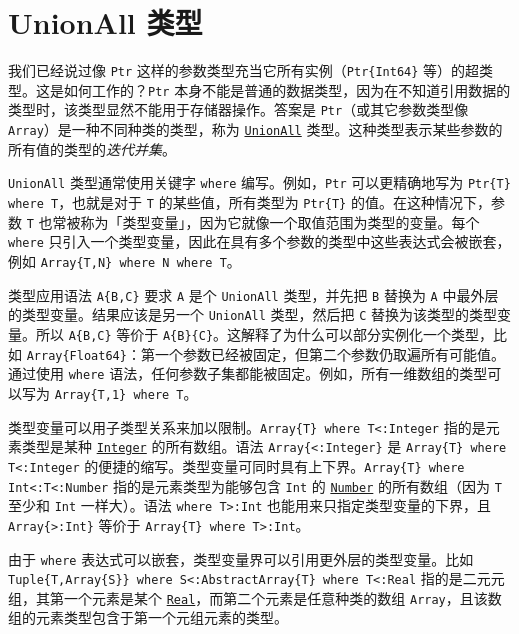 \section{UnionAll 类型}



我们已经说过像 \texttt{Ptr} 这样的参数类型充当它所有实例（\texttt{Ptr\{Int64\}} 等）的超类型。这是如何工作的？\texttt{Ptr} 本身不能是普通的数据类型，因为在不知道引用数据的类型时，该类型显然不能用于存储器操作。答案是 \texttt{Ptr}（或其它参数类型像 \texttt{Array}）是一种不同种类的类型，称为 \hyperlink{13291956087044414878}{\texttt{UnionAll}} 类型。这种类型表示某些参数的所有值的类型的\emph{迭代并集}。



\texttt{UnionAll} 类型通常使用关键字 \texttt{where} 编写。例如，\texttt{Ptr} 可以更精确地写为 \texttt{Ptr\{T\} where T}，也就是对于 \texttt{T} 的某些值，所有类型为 \texttt{Ptr\{T\}} 的值。在这种情况下，参数 \texttt{T} 也常被称为「类型变量」，因为它就像一个取值范围为类型的变量。每个 \texttt{where} 只引入一个类型变量，因此在具有多个参数的类型中这些表达式会被嵌套，例如 \texttt{Array\{T,N\} where N where T}。



类型应用语法 \texttt{A\{B,C\}} 要求 \texttt{A} 是个 \texttt{UnionAll} 类型，并先把 \texttt{B} 替换为 \texttt{A} 中最外层的类型变量。结果应该是另一个 \texttt{UnionAll} 类型，然后把 \texttt{C} 替换为该类型的类型变量。所以 \texttt{A\{B,C\}} 等价于 \texttt{A\{B\}\{C\}}。这解释了为什么可以部分实例化一个类型，比如 \texttt{Array\{Float64\}}：第一个参数已经被固定，但第二个参数仍取遍所有可能值。通过使用 \texttt{where} 语法，任何参数子集都能被固定。例如，所有一维数组的类型可以写为 \texttt{Array\{T,1\} where T}。



类型变量可以用子类型关系来加以限制。\texttt{Array\{T\} where T<:Integer} 指的是元素类型是某种 \hyperlink{8469131683393450448}{\texttt{Integer}} 的所有数组。语法 \texttt{Array\{<:Integer\}} 是 \texttt{Array\{T\} where T<:Integer} 的便捷的缩写。类型变量可同时具有上下界。\texttt{Array\{T\} where Int<:T<:Number} 指的是元素类型为能够包含 \texttt{Int} 的 \hyperlink{1990584313715697055}{\texttt{Number}} 的所有数组（因为 \texttt{T} 至少和 \texttt{Int} 一样大）。语法 \texttt{where T>:Int} 也能用来只指定类型变量的下界，且 \texttt{Array\{>:Int\}} 等价于 \texttt{Array\{T\} where T>:Int}。



由于 \texttt{where} 表达式可以嵌套，类型变量界可以引用更外层的类型变量。比如 \texttt{Tuple\{T,Array\{S\}\} where S<:AbstractArray\{T\} where T<:Real} 指的是二元元组，其第一个元素是某个 \hyperlink{6175959395021454412}{\texttt{Real}}，而第二个元素是任意种类的数组 \texttt{Array}，且该数组的元素类型包含于第一个元组元素的类型。



